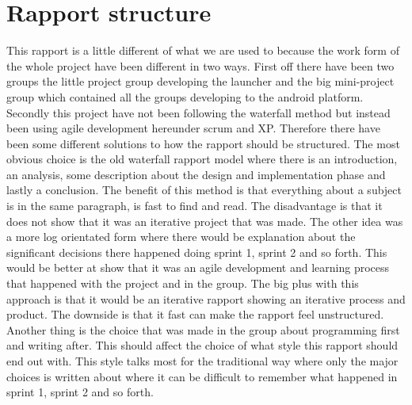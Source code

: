 \chapter{Rapport structure}

This rapport is a little different of what we are used to because the work form of the whole project have been different in two ways. First off there have been two groups the little project group developing the launcher and the big mini-project group which contained all the groups developing to the android platform. Secondly this project have not been following the waterfall method but instead been using agile development hereunder scrum and XP.
Therefore there have been some different solutions to how the rapport should be structured. The most obvious choice is the old waterfall rapport model where there is an introduction, an analysis, some description about the design and implementation phase and lastly a conclusion. The benefit of this method is that everything about a subject is in the same paragraph, is fast to find and read. The disadvantage is that it does not show that it was an iterative project that was made.
The other idea was a more log orientated form where there would be explanation about the significant decisions there happened doing sprint 1, sprint 2 and so forth. This would be better at show that it was an agile development and learning process that happened with the project and in the group. The big plus with this approach is that it would be an iterative rapport showing an iterative process and product. The downside is that it fast can make the rapport feel unstructured.
Another thing is the choice that was made in the group about programming first and writing after. This should affect the choice of what style this rapport should end out with. This style talks most for the traditional way where only the major choices is written about where it can be difficult to remember what happened in sprint 1, sprint 2 and so forth.